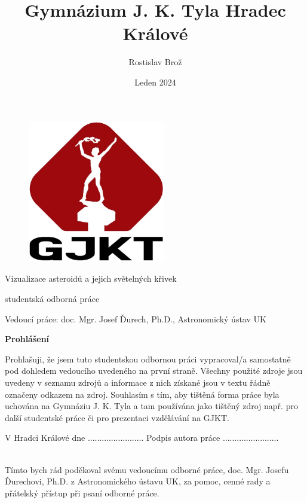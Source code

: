\documentclass[11pt]{article}
\begin{document}
\title{Gymnázium J. K. Tyla Hradec Králové}
\date{Leden 2024}
\author{Rostislav Brož}
\maketitle
\pagestyle{empty}
\thispagestyle{empty}

\begin{figure}[h]
\includegraphics[width=6cm]{figs/gjkt_logo.jpg}
\centering
\label{logo}
\end{figure}

\vskip2cm
\centerline{\LARGE Vizualizace asteroidů a jejich světelných křivek}

\vskip0.5cm
\centerline{studentská odborná práce}

\vskip2cm
\centerline{Vedoucí práce: doc. Mgr. Josef Ďurech, Ph.D., Astronomický ústav UK}

\newpage

{\bf Prohlášení}

\par
\hbox{}

Prohlašuji, že jsem tuto studentskou odbornou práci vypracoval/a samostatně pod dohledem vedoucího uvedeného na první straně. Všechny použité zdroje jsou uvedeny v seznamu zdrojů a informace z nich získané jsou v textu řádně označeny odkazem na zdroj. Souhlasím s tím, aby tištěná forma práce byla uchována na Gymnáziu J. K. Tyla a tam používána jako tištěný zdroj např. pro další studentské práce či pro prezentaci vzdělávání na GJKT.

\par
\hbox{}

V Hradci Králové dne ........................
\kern 2cm
Podpis autora práce ........................

\newpage

\newpage

\\
Tímto bych rád poděkoval svému vedoucímu odborné práce, doc. Mgr. Josefu Ďurechovi, Ph.D. z Astronomického ústavu UK, za pomoc, cenné rady a přátelský přístup při psaní odborné práce. 
\end{document}
